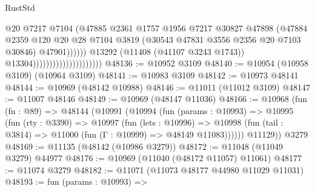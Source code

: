 \begin{lexlean}{RustStd}
\begin{coremodule}
                                                      @20
                                                      @7217
                                                      @7104
                                                      (@47885
                                                        @2361
                                                        @1757
                                                        @1956
                                                        @7217
                                                        @30827
                                                        @47898
                                                        (@47884
                                                          @2359
                                                          @120
                                                          @20
                                                          @28
                                                          @7104
                                                          @3819
                                                          (@30543
                                                            @47831
                                                            @3556
                                                            @2356
                                                            @20
                                                            @7103
                                                            @30846)
                                                          @47901))))))
                                              @13292
                                              (@11408 (@41107 @3243 @1743))
                                              @13304)))))))))))))))))))))
@48136 := @10952 @3109
@48140 := @10954 (@10958 @3109) (@10964 @3109)
@48141 := @10983 @3109
@48142 := @10973 @48141
@48144 := @10969 (@48142 @10988)
@48146 := @11011 (@11012 @3109)
@48147 := @11007 @48146
@48149 := @10969 (@48147 @11036)
@48166 := @10968
    (fun (fn : @89) =>
    @48144
      (@10991
        (@10994
          (fun (params : @10993) =>
          @10995
            (fun (rty : @3390) =>
            @10997
              (fun (lets : @10996) =>
              @10998 (fun (tail : @3814) => @11000 (fun (Γ : @10999) => @48149 @11083))))))
        @11129))
    @3279
@48169 := @11135 (@48142 (@10986 @3279))
@48172 := @11048 (@11049 @3279) @44977
@48176 := @10969 (@11040 (@48172 @11057) @11061)
@48177 := @11074 @3279
@48182 := @11071 (@11073 @48177 @44980 @11029 @11031)
@48193 := fun (params : @10993) =>

\end{coremodule}
\end{lexlean}

